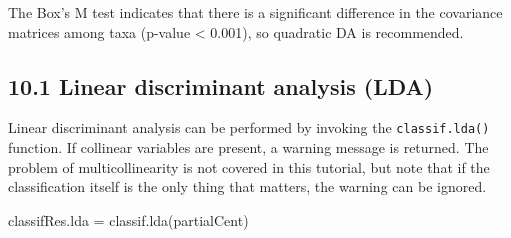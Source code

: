 \documentclass[
  11pt,
  a4paper]{article}
\newenvironment{Shaded}{\begin{snugshade}}{\end{snugshade}}
\newcommand{\FunctionTok}[1]{\textcolor[rgb]{0.00,0.00,0.00}{#1}}
\newcommand{\NormalTok}[1]{#1}
\newcommand{\OtherTok}[1]{\textcolor[rgb]{0.56,0.35,0.01}{#1}}
\begin{document}
The Box's M test indicates that there is a significant difference in the
covariance matrices among taxa (p-value \textless{} 0.001), so quadratic
DA is recommended.

\hypertarget{linear-discriminant-analysis-lda}{%
\subsection{10.1 Linear discriminant analysis
(LDA)}\label{linear-discriminant-analysis-lda}}

Linear discriminant analysis can be performed by invoking the
\texttt{classif.lda()} function. If collinear variables are present, a
warning message is returned. The problem of multicollinearity is not
covered in this tutorial, but note that if the classification itself is
the only thing that matters, the warning can be ignored.

\begin{Shaded}
\begin{Highlighting}[]
\NormalTok{classifRes.lda }\OtherTok{=} \FunctionTok{classif.lda}\NormalTok{(partialCent)}
\end{Highlighting}
\end{Shaded}
\end{document}
